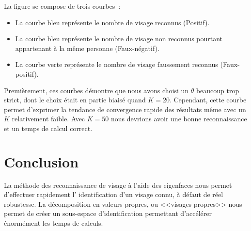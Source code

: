 \documentclass[a4paper]{article}
\begin{document}
La figure se compose de trois courbes~:
\begin{itemize}
    \item La courbe bleu représente le nombre de visage reconnus (Positif).
    \item La courbe bleu représente le nombre de visage non reconnus pourtant appartenant à la même personne
        (Faux-négatif).
    \item La courbe verte représente le nombre de visage faussement reconnus (Faux-positif).
\end{itemize}

Premièrement, ces courbes démontre que nous avons choisi un $\theta$ beaucoup trop strict, dont le choix était
en partie biaisé quand $K=20$.
Cependant, cette courbe permet d'exprimer la tendance de convergence rapide des résultats même avec un $K$
relativement faible. Avec $K=50$ nous devrions avoir une bonne reconnaissance et un temps de calcul correct.

\section{Conclusion}

La méthode des reconnaissance de visage à l'aide des eigenfaces nous permet d'effectuer rapidement l'
identification d'un visage connu, à défaut de réel robustesse. 
La décomposition en valeurs propres, ou <<visages propres>> nous permet de créer un sous-espace
d'identification permettant d'accélérer énormément les temps de calculs.
\end{document}
